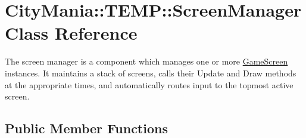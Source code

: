 \hypertarget{classCityMania_1_1TEMP_1_1ScreenManager}{
\section{CityMania::TEMP::ScreenManager Class Reference}
\label{classCityMania_1_1TEMP_1_1ScreenManager}
}


The screen manager is a component which manages one or more \hyperlink{classCityMania_1_1GameScreen}{GameScreen} instances. It maintains a stack of screens, calls their Update and Draw methods at the appropriate times, and automatically routes input to the topmost active screen.  
\subsection*{Public Member Functions}
